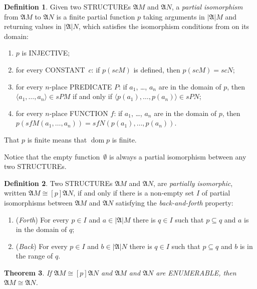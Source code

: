 \documentclass[10pt,a4paper]{article}
\makeatletter
\newcommand*{\olup}[1]{\MakeUppercase{#1}}
\theoremstyle{plain}
\newtheorem{thm}{Theorem}[section]
\theoremstyle{definition}
\newtheorem{defn}[thm]{Definition}
\theoremstyle{remark}
\newcommand*{\ollabel}[1]{\label{#1}}
\newcommand{\olref}{\@ifnextchar[{\olref@i}{\olref@final}}
\def\olref@i[#1]{\@ifnextchar[{\olref@ii}{\olref@final}}
\def\olref@ii[#1]{\@ifnextchar[{\olref@iii}{\olref@final}}
\def\olref@iii[#1]{\olref@final}
\def\olref@final#1{\ref{#1}}
\providecommand{\Struct}{\ensuremath{\mathfrak{A}}}
\providecommand{\Domain}{\ensuremath{|\mathfrak{A}|}}
\providecommand{\Assign}{\ensuremath{s}}
\providecommand{\dom}{\operatorname{dom}}
\providecommand{\iso}{\cong}
\makeatother
\begin{document}
\begin{defn}
  Given two \olup{structure}s $\Struct{M}$ and $\Struct{N}$, a
  \emph{partial isomorphism} from $\Struct{M}$ to $\Struct{N}$ is a
  finite partial function $p$ taking arguments in $\Domain M$ and returning
  values in $\Domain N$, which satisfies the isomorphism conditions from
  \olref[iso]{defn:isomorphism} on its domain:
  \begin{enumerate}
  \item $p$ is \olup{injective};
  \item for every \olup{constant}~$c$: if $p(\Assign{c}{M})$ is defined,
    then $p(\Assign{c}{M}) = \Assign{c}{N}$;
  \item for every $n$-place \olup{predicate} $P$: if $a_1$, \dots, $a_n$
    are in the domain of $p$, then $\langle a_1, \dots, a_n\rangle \in
    \Assign P M$ if and only if $\langle p(a_1), \dots, p(a_n) \rangle
    \in \Assign P N$;
  \item for every $n$-place \olup{function} $f$: if $a_1$, \dots, $a_n$
    are in the domain of $p$, then $p(\Assign f M (a_1, \dots,a_n))
    = \Assign f N (p(a_1), \dots, p(a_n))$.
  \end{enumerate}
  That $p$ is finite means that $\dom{p}$ is finite.
\end{defn}

Notice that the empty function~$\emptyset$ is always a partial
isomorphism between any two \olup{structure}s.

\begin{defn}\ollabel{defn:partialisom}
  Two \olup{structure}s $\Struct{M}$ and $\Struct{N}$, are
  \emph{partially isomorphic}, written $\Struct{M} \iso[p]
  \Struct{N}$, if and only if there is a non-empty set $I$
  of partial isomorphisms between $\Struct{M}$ and $\Struct{N}$
  satisfying the \emph{back-and-forth} property:
  \begin{enumerate}
  \item (\emph{Forth}) For every $p \in I$ and $a \in \Domain M$
    there is $q \in I$ such that $p \subseteq q$ and $a$ is
    in the domain of $q$;
  \item (\emph{Back}) For every $p \in I$ and $b \in \Domain N$
    there is $q \in I$ such that $p \subseteq q$ and $b$ is
    in the range of $q$.
  \end{enumerate}
\end{defn}

\begin{thm}\ollabel{thm:p-isom1}
  If $\Struct{M} \iso[p] \Struct{N}$ and $\Struct{M}$ and
  $\Struct{N}$ are \olup{enumerable}, then $\Struct{M} \iso
  \Struct{N}$.
\end{thm}
\end{document}
